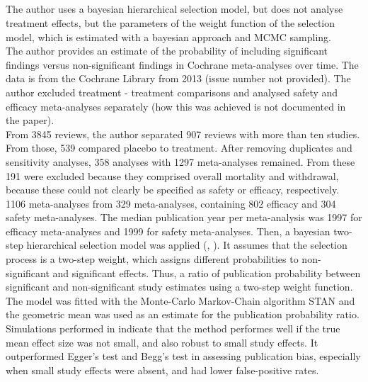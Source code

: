 \documentclass[11pt,a4paper,twoside]{book}\usepackage[]{graphicx}\usepackage[]{color}
\begin{document}
\subsection{\citet{kicinsky}}
The author uses a bayesian hierarchical selection model, but does not analyse treatment effects, but the parameters of the weight function of the selection model, which is estimated with a bayesian approach and MCMC sampling. \\
The author provides an estimate of the probability of including significant findings versus non-significant findings in Cochrane meta-analyses over time. The data is from the Cochrane Library from 2013 (issue number not provided). The author excluded treatment - treatment comparisons and analysed safety and efficacy meta-analyses separately (how this was achieved is not documented in the paper). \\
From 3845 reviews, the author separated 907 reviews with more than ten studies. From those, 539 compared placebo to treatment. After removing duplicates and sensitivity analyses, 358 analyses with 1297 meta-analyses remained. From these 191 were excluded because they comprised overall mortality and withdrawal, because these could not clearly be specified as safety or efficacy, respectively. \\
1106 meta-analyses from 329 meta-analyses, containing 802 efficacy and 304 safety meta-analyses. The median publication year per meta-analysis was 1997 for efficacy meta-analyses and 1999 for safety meta-analyses. Then, a bayesian two-step hierarchical selection model was applied (\citet{bayesian.selection.model}, \citet{bayesian.selection.model.2}). It assumes that the selection process is a two-step weight, which assigns different probabilities to non-significant and significant effects. Thus, a ratio of publication probability between significant and non-significant study estimates using a two-step weight function. The model was fitted with the Monte-Carlo Markov-Chain algorithm STAN and the geometric mean was used as an estimate for the publication probability ratio. Simulations performed in \citep{bayesian.selection.model} indicate that the method performes well if the true mean effect size was not small, and also robust to small study effects. It outperformed Egger's test and Begg's test in assessing publication bias, especially when small study effects were absent, and had lower false-positive rates. \\
\end{document}
